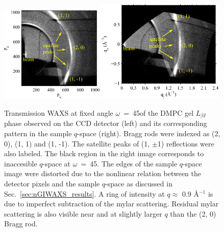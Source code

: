 \begin{figure}[htbp]
  \centering
  \includegraphics[width=0.44\textwidth]{figures/ripple/tWAXS/twaxs_gel_ccd}
  \includegraphics[width=0.54\textwidth]{figures/ripple/tWAXS/twaxs_gel_q}
  \caption[Transmission WAXS of the DMPC gel phase]
  {Transmission WAXS at fixed angle $\omega$~=~45\textdegree of the DMPC gel 
  $L_{\beta I}$ phase observed on
  the CCD detector (left) and its corresponding pattern in the sample $q$-space
  (right). Bragg rods were indexed as (2, 0), (1, 1) and (1, -1). The satellite 
  peaks of (1, $\pm$1) reflections were also labeled. The black region in
  the right image corresponds to inaccesible $q$-space at 
  $\omega$~=~45\textdegree. The edges
  of the sample $q$-space image were distorted due to the nonlinear relation
  between the detector pixels and the sample $q$-space as discussed in 
  Sec.~\ref{sec:nGIWAXS_results}. A ring of intensity
  at $q \approx$ 0.9 \AA$^{-1}$ is due to imperfect subtraction of the mylar
  scattering. Residual mylar scattering is also visible near and at slightly 
  larger $q$ than the (2, 0) Bragg rod.}
  \label{fig:twaxs_gel}
\end{figure}

